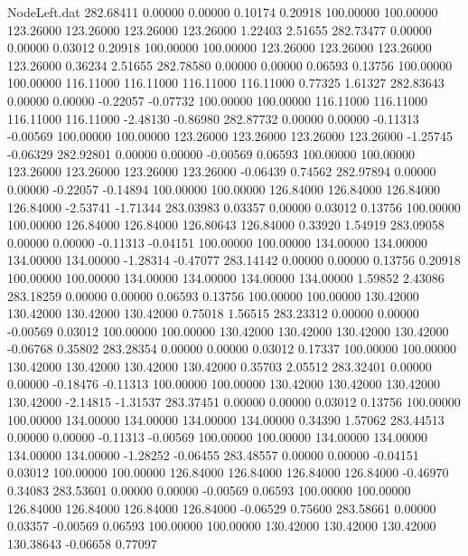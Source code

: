 \begin{filecontents}{NodeLeft.dat}
 282.68411    0.00000    0.00000     0.10174    0.20918  100.00000  100.00000  123.26000  123.26000  123.26000  123.26000    1.22403    2.51655
 282.73477    0.00000    0.00000     0.03012    0.20918  100.00000  100.00000  123.26000  123.26000  123.26000  123.26000    0.36234    2.51655
 282.78580    0.00000    0.00000     0.06593    0.13756  100.00000  100.00000  116.11000  116.11000  116.11000  116.11000    0.77325    1.61327
 282.83643    0.00000    0.00000    -0.22057   -0.07732  100.00000  100.00000  116.11000  116.11000  116.11000  116.11000   -2.48130   -0.86980
 282.87732    0.00000    0.00000    -0.11313   -0.00569  100.00000  100.00000  123.26000  123.26000  123.26000  123.26000   -1.25745   -0.06329
 282.92801    0.00000    0.00000    -0.00569    0.06593  100.00000  100.00000  123.26000  123.26000  123.26000  123.26000   -0.06439    0.74562
 282.97894    0.00000    0.00000    -0.22057   -0.14894  100.00000  100.00000  126.84000  126.84000  126.84000  126.84000   -2.53741   -1.71344
 283.03983    0.03357    0.00000     0.03012    0.13756  100.00000  100.00000  126.84000  126.84000  126.80643  126.84000    0.33920    1.54919
 283.09058    0.00000    0.00000    -0.11313   -0.04151  100.00000  100.00000  134.00000  134.00000  134.00000  134.00000   -1.28314   -0.47077
 283.14142    0.00000    0.00000     0.13756    0.20918  100.00000  100.00000  134.00000  134.00000  134.00000  134.00000    1.59852    2.43086
 283.18259    0.00000    0.00000     0.06593    0.13756  100.00000  100.00000  130.42000  130.42000  130.42000  130.42000    0.75018    1.56515
 283.23312    0.00000    0.00000    -0.00569    0.03012  100.00000  100.00000  130.42000  130.42000  130.42000  130.42000   -0.06768    0.35802
 283.28354    0.00000    0.00000     0.03012    0.17337  100.00000  100.00000  130.42000  130.42000  130.42000  130.42000    0.35703    2.05512
 283.32401    0.00000    0.00000    -0.18476   -0.11313  100.00000  100.00000  130.42000  130.42000  130.42000  130.42000   -2.14815   -1.31537
 283.37451    0.00000    0.00000     0.03012    0.13756  100.00000  100.00000  134.00000  134.00000  134.00000  134.00000    0.34390    1.57062
 283.44513    0.00000    0.00000    -0.11313   -0.00569  100.00000  100.00000  134.00000  134.00000  134.00000  134.00000   -1.28252   -0.06455
 283.48557    0.00000    0.00000    -0.04151    0.03012  100.00000  100.00000  126.84000  126.84000  126.84000  126.84000   -0.46970    0.34083
 283.53601    0.00000    0.00000    -0.00569    0.06593  100.00000  100.00000  126.84000  126.84000  126.84000  126.84000   -0.06529    0.75600
 283.58661    0.00000    0.03357    -0.00569    0.06593  100.00000  100.00000  130.42000  130.42000  130.42000  130.38643   -0.06658    0.77097

\end{filecontents}
